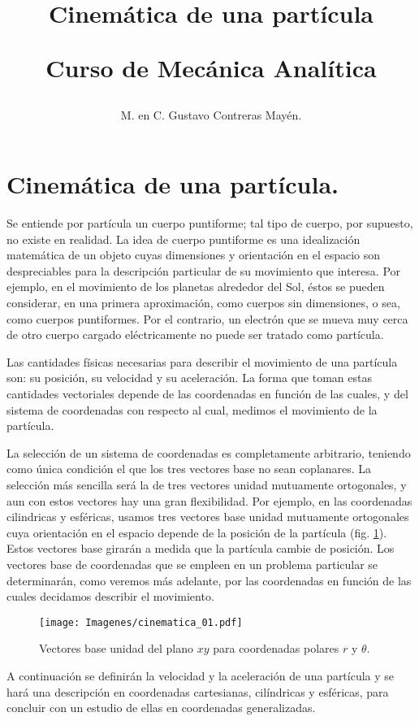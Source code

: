 \documentclass[12pt]{article}
\title{Cinemática de una partícula \\ \begin{Large} Curso de Mecánica Analítica \end{Large}}
\author{M. en C. Gustavo Contreras Mayén.}
\date{ }
\begin{document}
\maketitle
\fontsize{14}{14}\selectfont

\tableofcontents

\newpage

\section{Cinemática de una partícula.}

Se entiende por partícula un cuerpo puntiforme; tal tipo de cuerpo, por supuesto, no existe en realidad. La idea de cuerpo puntiforme es una idealización matemática de un objeto cuyas dimensiones y orientación en el espacio son despreciables para la descripción particular de su movimiento que interesa. Por ejemplo, en el movimiento de los planetas alrededor del Sol, éstos se pueden considerar, en una primera aproximación, como cuerpos sin dimensiones, o sea, como cuerpos puntiformes. Por el contrario, un electrón que se mueva muy cerca de otro cuerpo cargado eléctricamente no puede ser tratado como partícula.
\par
Las cantidades físicas necesarias para describir el movimiento de una partícula son: su posición, su velocidad y su aceleración. La forma que toman estas cantidades vectoriales depende de las coordenadas en función de las cuales, y del sistema de coordenadas con respecto al cual, medimos el movimiento de la partícula.
\par
La selección de un sistema de coordenadas es completamente arbitrario, teniendo como única condición el que los tres vectores base no sean coplanares. La selección más sencilla será la de tres vectores unidad mutuamente ortogonales, y aun con estos vectores hay una gran flexibilidad. Por ejemplo, en las coordenadas cilindricas y esféricas, usamos tres vectores base unidad mutuamente ortogonales cuya orientación en el espacio depende de la posición de la partícula (fig. \ref{fig:figura_02_01}). Estos vectores base girarán a medida que la partícula cambie de posición. Los vectores base de coordenadas que se empleen en un problema particular se determinarán, como veremos más adelante, por las coordenadas en función de las cuales decidamos describir 
el movimiento.
\begin{figure}[H]
    \centering
    \texttt{[image: Imagenes/cinematica\_01.pdf]}
    \caption{Vectores base unidad del plano $xy$ para coordenadas polares $r$ y $\theta$.}
    \label{fig:figura_02_01}    
\end{figure}
A continuación se definirán la velocidad y la aceleración de una partícula y se hará una descripción en coordenadas cartesianas, cilíndricas y esféricas, para concluir con un estudio de ellas en coordenadas generalizadas.
\end{document}
